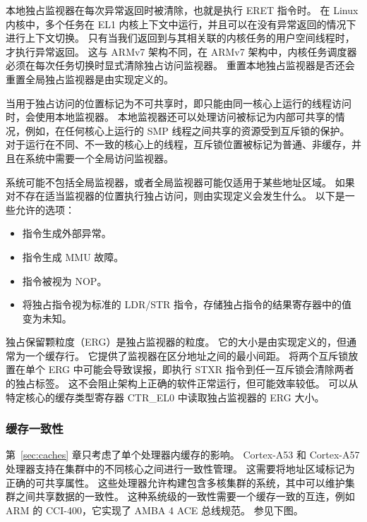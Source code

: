 本地独占监视器在每次异常返回时被清除，也就是执行 ERET 指令时。
在 Linux 内核中，多个任务在 EL1 内核上下文中运行，并且可以在没有异常返回的情况下进行上下文切换。
只有当我们返回到与其相关联的内核任务的用户空间线程时，才执行异常返回。
这与 ARMv7 架构不同，在 ARMv7 架构中，内核任务调度器必须在每次任务切换时显式清除独占访问监视器。
重置本地独占监视器是否还会重置全局独占监视器是由实现定义的。

当用于独占访问的位置标记为不可共享时，即只能由同一核心上运行的线程访问时，会使用本地监视器。
本地监视器还可以处理访问被标记为内部可共享的情况，例如，在任何核心上运行的 SMP 线程之间共享的资源受到互斥锁的保护。
对于运行在不同、不一致的核心上的线程，互斥锁位置被标记为普通、非缓存，并且在系统中需要一个全局访问监视器。

系统可能不包括全局监视器，或者全局监视器可能仅适用于某些地址区域。
如果对不存在适当监视器的位置执行独占访问，则由实现定义会发生什么。
以下是一些允许的选项：

\begin{itemize}
\item
  指令生成外部异常。
\item
  指令生成 MMU 故障。
\item
  指令被视为 NOP。
\item
  将独占指令视为标准的 LDR/STR
  指令，存储独占指令的结果寄存器中的值变为未知。
\end{itemize}

独占保留颗粒度（ERG）是独占监视器的粒度。
它的大小是由实现定义的，但通常为一个缓存行。
它提供了监视器在区分地址之间的最小间距。
将两个互斥锁放置在单个 ERG 中可能会导致误报，即执行 STXR 指令到任一互斥锁会清除两者的独占标签。
这不会阻止架构上正确的软件正常运行，但可能效率较低。
可以从特定核心的缓存类型寄存器 CTR\_EL0 中读取独占监视器的 ERG 大小。

\subsubsection{缓存一致性}

第~\ref{sec:caches} 章只考虑了单个处理器内缓存的影响。
Cortex-A53 和 Cortex-A57 处理器支持在集群中的不同核心之间进行一致性管理。
这需要将地址区域标记为正确的可共享属性。
这些处理器允许构建包含多核集群的系统，其中可以维护集群之间共享数据的一致性。
这种系统级的一致性需要一个缓存一致的互连，例如 ARM 的 CCI-400，它实现了 AMBA 4 ACE 总线规范。
参见下图。


